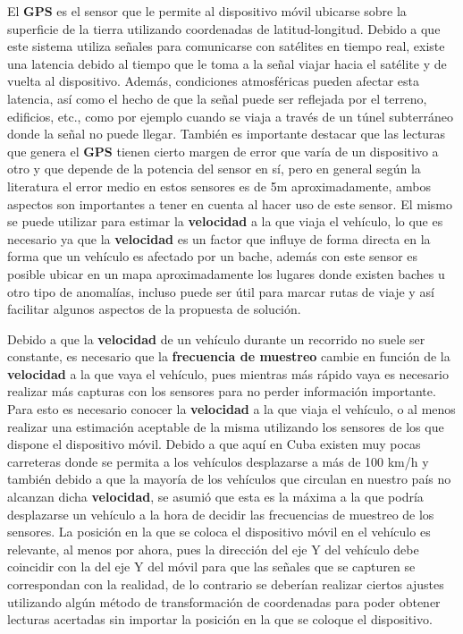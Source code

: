 	El \textbf{GPS} es el sensor que le permite al dispositivo móvil ubicarse sobre la superficie de la tierra utilizando 
	coordenadas de latitud-longitud. Debido a que este sistema utiliza señales para comunicarse con satélites en 
	tiempo real, existe una latencia debido al tiempo que le toma a la señal viajar hacia el satélite y de vuelta 
	al dispositivo. Además, condiciones atmosféricas pueden afectar esta latencia, así como el hecho de que la señal 
	puede ser reflejada por el terreno, edificios, etc., como por ejemplo cuando se viaja a través de un túnel subterráneo 
	donde la señal no puede llegar. También es importante destacar que las lecturas que genera el \textbf{GPS} tienen cierto 
	margen de error que varía de un dispositivo a otro y que depende de la potencia del sensor en sí, pero en general según la 
	literatura el error medio en estos sensores es de 5m aproximadamente, ambos aspectos son importantes a tener en cuenta al 
	hacer uso de este sensor. El mismo se puede utilizar para estimar la \textbf{velocidad} a la que viaja el vehículo, lo que
	es necesario ya que la \textbf{velocidad} es un factor que influye de forma directa en la forma que un vehículo es afectado
	por un bache, además con este sensor es posible ubicar en un mapa aproximadamente los lugares donde existen baches u otro
	tipo de anomalías, incluso puede ser útil para marcar rutas de viaje y así facilitar algunos aspectos de la propuesta de
	solución.

	Debido a que la \textbf{velocidad} de un vehículo durante un recorrido no suele ser constante, es necesario
	que la \textbf{frecuencia de muestreo} cambie en función de la \textbf{velocidad} a la que vaya el vehículo,
	pues mientras más rápido vaya es necesario realizar más capturas con los sensores para no perder información
	importante. Para esto es necesario conocer la \textbf{velocidad} a la que viaja el vehículo, o al menos
	realizar una estimación aceptable de la misma utilizando los sensores de los que dispone el dispositivo móvil.
	Debido a que aquí en Cuba existen muy pocas carreteras donde se permita a los vehículos desplazarse a más de
	100 km/h y también debido a que la mayoría de los vehículos que circulan en nuestro país no alcanzan dicha
	\textbf{velocidad}, se asumió que esta es la máxima a la que podría desplazarse un vehículo a la hora de decidir
	las frecuencias de muestreo de los sensores. La posición en la que se coloca el dispositivo móvil en el vehículo
	es relevante, al menos por ahora, pues la dirección del eje Y del vehículo debe coincidir con la del eje Y del
	móvil para que las señales que se capturen se correspondan con la realidad, de lo contrario se deberían realizar
	ciertos ajustes utilizando algún método de transformación de coordenadas para poder obtener lecturas acertadas
	sin importar la posición en la que se coloque el dispositivo.

